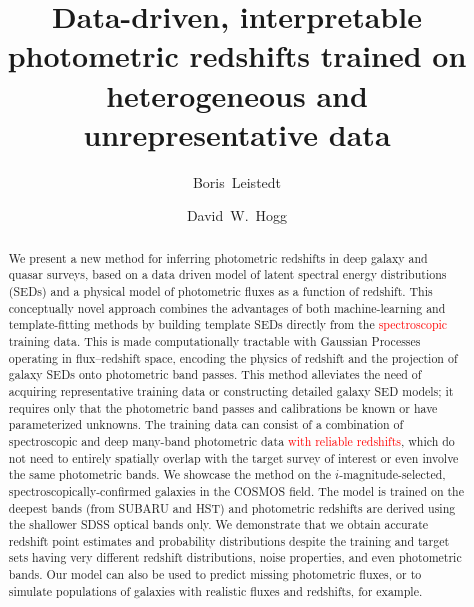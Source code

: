 \documentclass[aps,prd,showpacs,superscriptaddress,groupedaddress]{revtex4}  %
\newcommand{\bl}[1]{\textcolor{red}{#1}}
\begin{document}
 
\title{\hspace*{-2mm}Data-driven, interpretable photometric redshifts trained on heterogeneous and unrepresentative data }

\author{Boris~Leistedt}
  
\author{David~W.~Hogg}
  
\begin{abstract}
We present a new method for inferring photometric redshifts in deep galaxy and quasar surveys, based on a data driven model of latent spectral energy distributions (SEDs) and a physical model of photometric fluxes as a function of redshift. This conceptually novel approach combines the advantages of both machine-learning and template-fitting methods by building template SEDs directly from the \bl{spectroscopic} training data. This is made computationally tractable with Gaussian Processes operating in flux--redshift space, encoding the physics of redshift and the projection of galaxy SEDs onto photometric band passes. This method alleviates the need of acquiring representative training data or constructing detailed galaxy SED models; it requires only that the photometric band passes and calibrations be known or have parameterized unknowns. The training data can consist of a combination of spectroscopic and deep many-band photometric data \bl{with reliable redshifts}, which do not need to entirely spatially overlap with the target survey of interest or even involve the same photometric bands. We showcase the method on the $i$-magnitude-selected, spectroscopically-confirmed galaxies in the COSMOS field. The model is trained on the deepest bands (from SUBARU and HST) and photometric redshifts are derived using the shallower SDSS optical bands only. We demonstrate that we obtain accurate redshift point estimates and probability distributions despite the training and target sets having very different redshift distributions, noise properties, and even photometric bands. Our model can also be used to predict missing photometric fluxes, or to simulate populations of galaxies with realistic fluxes and redshifts, for example. 
\end{abstract}
\end{document}
